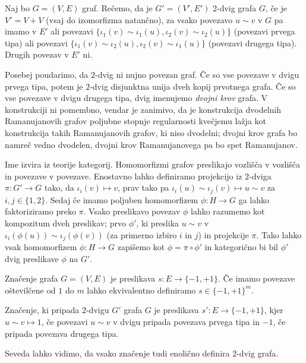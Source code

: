 \begin{definicija}
    Naj bo \(G = (V, E)\) graf. Rečemo, da je \(G'= (V', E')\) 2-dvig grafa \(G\), če je \(V' = V + V\) (vsaj do izomorfizma natančno), za vsako povezavo \(u\sim v\) v \(G\) pa imamo v \(E'\) ali povezavi \(\{\iota_1(v)\sim \iota_1(u), \iota_2(v)\sim \iota_2(u)\}\) (povezavi prvega tipa) ali povezavi \(\{\iota_1(v)\sim \iota_2(u), \iota_2(v)\sim \iota_1(u)\}\) (povezavi drugega tipa). Drugih povezav v \(E'\) ni.
\end{definicija}

Posebej poudarimo, da \(2\)-dvig ni nujno povezan graf. Če so vse povezave v dvigu prvega tipa, potem je \(2\)-dvig disjunktna unija dveh kopij prvotnega grafa. Če so vse povezave v dvigu drugega tipa, dvig imenujemo \emph{dvojni krov} grafa. V konstrukciji ni pomembno, vendar je zanimivo, da je konstrukcija dvodelnih Ramanujanovih grafov poljubne stopnje regularnosti kvečjemu lažja kot konstrukcija takih Ramanujanovih grafov, ki niso dvodelni; dvojni krov grafa bo namreč vedno dvodelen, dvojni krov Ramanujanovega pa bo spet Ramanujanov.

Ime izvira iz teorije kategorij. Homomorfizmi grafov preslikajo vozlišča v vozlišča in povezave v povezave. Enostavno lahko definiramo projekcijo iz \(2\)-dviga \(\pi: G'\to G\) tako, da \(\iota_i(v)\mapsto v\), prav tako pa \(\iota_i(u)\sim\iota_j(v)\mapsto u\sim v\) za \(i, j\in \{1,2\}\). Sedaj če imamo poljuben homomorfizem \(\phi: H\to G\) ga lahko faktoriziramo preko \(\pi\). Vsako preslikavo povezav \(\phi\) lahko razumemo kot kompozitum dveh preslikav; prvo \(\phi'\), ki preslika \(u\sim v\) v \(\iota_i(\phi(u)) \sim \iota_j(\phi(v))\) (za primerno izbiro \(i\) in \(j\)) in projekcije \(\pi\). Tako lahko vsak homomorfizem \(\phi: H\to G\) zapišemo kot \(\phi = \pi\circ \phi'\) in kategorično bi bil \(\phi'\) dvig preslikave \(\phi\) na \(G'\).

\begin{definicija}
    Značenje grafa \(G = (V, E)\) je preslikava \(s: E\to \{-1, +1\}\). Če imamo povezave oštevilčene od \(1\) do \(m\) lahko ekvivalentno definiramo \(s\in \{-1, +1\}^m\).

    Značenje, ki pripada \(2\)-dvigu \(G'\) grafa \(G\) je preslikava \(s': E \to \{-1, +1\}\), kjer \(u\sim v \mapsto 1\), če povezavi \(u\sim v\) v dvigu pripada povezava prvega tipa in \(-1\), če pripada povezava drugega tipa.
\end{definicija}

Seveda lahko vidimo, da vsako značenje tudi enolično definira \(2\)-dvig grafa.

